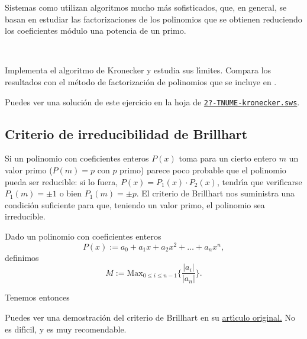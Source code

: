 Sistemas como {\sage} utilizan algoritmos mucho m\'as sofisticados, que, en
general,  se basan en estudiar las factorizaciones de los polinomios que se
obtienen reduciendo los coeficientes m\'odulo una potencia de un primo.

\

\begin{ejer}
 Implementa el algoritmo de Kronecker y estudia sus l\'{\i}mites. Compara los
resultados con el m\'etodo de factorizaci\'on de polinomios que se incluye en
{\sage}.
\end{ejer}

Puedes ver una soluci\'on de este ejercicio en la hoja de {\sage}
\href{http://sage.mat.uam.es:8888/home/pub/?/}{\tt 2?-TNUME-kronecker.sws}.


\subsection{Criterio de irreducibilidad de Brillhart}

Si un polinomio con coeficientes enteros $P(x)$ toma para un cierto entero $m$
un valor primo ($P(m)=p$ con $p$ primo) parece poco probable que el polinomio
pueda ser reducible: si lo fuera,  $P(x)=P_1(x)\cdot P_2(x)$, tendr\'{\i}a que
verificarse $P_1(m)=\pm 1$ o bien $P_1(m)=\pm p.$ El criterio de Brillhart nos
suministra una condici\'on suficiente para que, teniendo un valor primo, el
polinomio sea irreducible. 


Dado un polinomio con coeficientes enteros 
\[P(x):= a_0+a_1x+a_2x^2+\dots+a_nx^n,\]
\noindent definimos
\[M:=\text{Max}_{0\le i\le n-1}\Big\{\frac{\vert a_i\vert}{\vert 
a_n\vert}\Big\}.\]

Tenemos entonces
\begin{center}
\end{center}

Puedes ver una demostraci\'on del criterio de Brillhart en su 
\href{http://150.244.21.37/PDFs/TNUME/brillhart.pdf}{art\'{\i}culo original.} No es dif\'{\i}cil,
y es muy recomendable.  

\par\medskip\par

